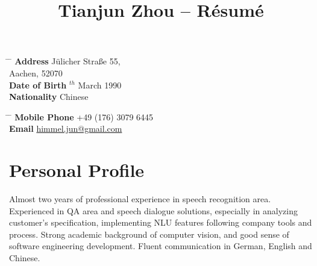 \documentclass[10pt]{article} %
\begin{document}

\title{Tianjun Zhou -- Résumé} %


\parbox{0.5\textwidth}{ %
\begin{tabbing} %
\hspace{3cm} \= \hspace{4cm} \= \kill %
{\bf Address} \> J\"ulicher Stra\ss e 55,\\ %
\> Aachen, 52070 \\ %
{\bf Date of Birth} $^{th}$ March 1990 \\ %
{\bf Nationality} \> Chinese %
\end{tabbing}}
\hfill %
\parbox{0.5\textwidth}{ %
\begin{tabbing} %
\hspace{3cm} \= \hspace{4cm} \= \kill %
{\bf Mobile Phone} \> +49 (176) 3079 6445 \\ %
{\bf Email} \> \href{mailto:himmel.jun@gmail.com}{himmel.jun@gmail.com} \\ %
\end{tabbing}}


\section{Personal Profile}

Almost two years of professional experience in speech recognition area. Experienced in QA area and speech dialogue solutions, especially in analyzing customer's specification, implementing NLU features following company tools and process. Strong academic background of computer vision, and good sense of software engineering development. Fluent communication in German, English and Chinese. 
\end{document}
